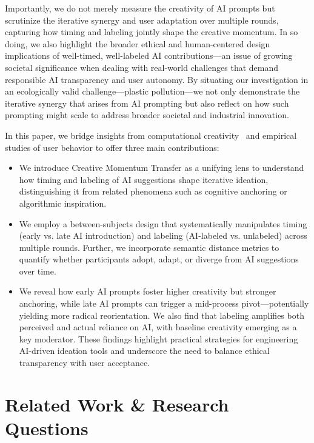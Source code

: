 \documentclass{article}
\begin{document}
Importantly, we do not merely measure the creativity of AI prompts but scrutinize the iterative synergy and user adaptation over multiple rounds, capturing how timing and labeling jointly shape the creative momentum. In so doing, we also highlight the broader ethical and human-centered design implications of well-timed, well-labeled AI contributions—an issue of growing societal significance when dealing with real-world challenges that demand responsible AI transparency and user autonomy. By situating our investigation in an ecologically valid challenge—plastic pollution—we not only demonstrate the iterative synergy that arises from AI prompting but also reflect on how such prompting might scale to address broader societal and industrial innovation.

In this paper, we bridge insights from computational creativity~\cite{boden2008computers,lamb2018evaluating} and empirical studies of user behavior to offer three main contributions:
\begin{itemize}
    \item We introduce Creative Momentum Transfer as a unifying lens to understand how timing and labeling of AI suggestions shape iterative ideation, distinguishing it from related phenomena such as cognitive anchoring or algorithmic inspiration.
    \item We employ a between-subjects design that systematically manipulates timing (early vs. late AI introduction) and labeling (AI-labeled vs. unlabeled) across multiple rounds. Further, we incorporate semantic distance metrics to quantify whether participants adopt, adapt, or diverge from AI suggestions over time.
    \item We reveal how early AI prompts foster higher creativity but stronger anchoring, while late AI prompts can trigger a mid-process pivot—potentially yielding more radical reorientation. We also find that labeling amplifies both perceived and actual reliance on AI, with baseline creativity emerging as a key moderator. These findings highlight practical strategies for engineering AI-driven ideation tools and underscore the need to balance ethical transparency with user acceptance.
\end{itemize}



\section{Related Work \& Research Questions}
\end{document}
